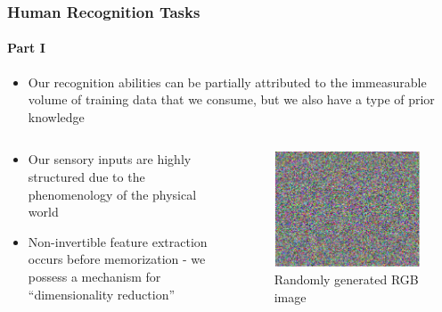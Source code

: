 \documentclass[aspectratio=169,usenames,dvipsnames]{beamer}
\begin{document}
\begin{frame}
\frametitle{Human Recognition Tasks}
\framesubtitle{Part I}

\begin{itemize}
\item Our recognition abilities can be partially attributed to the immeasurable volume of \alert{training data} that we consume, but we also have a type of \alert{prior knowledge}
\end{itemize}


\begin{columns}[c]

\hspace{2ex}
\begin{column}{.5\linewidth}

\begin{itemize}
\item Our sensory inputs are highly structured due to the phenomenology of the physical world
\vspace{1em}
\item Non-invertible feature extraction occurs before memorization - we possess a mechanism for ``dimensionality reduction''
\end{itemize}

\end{column}




\begin{column}{.5\linewidth}

\begin{figure}
\centering
\includegraphics[width=0.7\linewidth]{RGB_random.pdf}
\caption{Randomly generated RGB image}
\label{fig:RGB_random}
\end{figure}

\end{column}

\end{columns}

\end{frame}
\end{document}
